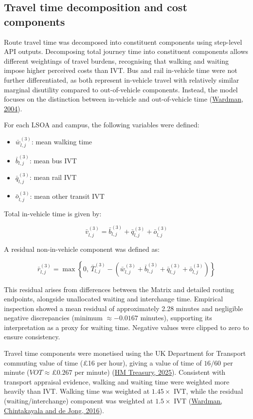 \documentclass[11pt,a4paper]{article}
\newcommand{\hcite}[2]{\hyperlink{#1}{#2}}
\newcommand{\hcite}[2]{\hyperlink{#1}{#2}}
\begin{document}
\subsection{Travel time decomposition and cost components}

Route travel time was decomposed into constituent components using step-level API outputs. Decomposing total journey time into constituent components allows different weightings of travel burdens, recognising that walking and waiting impose higher perceived costs than IVT. Bus and rail in-vehicle time were not further differentiated, as both represent in-vehicle travel with relatively similar marginal disutility compared to out-of-vehicle components. Instead, the model focuses on the distinction between in-vehicle and out-of-vehicle time (\hcite{wardman2004}{Wardman, 2004}).

For each LSOA and campus, the following variables were defined:

\begin{itemize}
    \item \(\bar{w}_{l,j}^{(3)}\): mean walking time
    \item \(\bar{b}_{l,j}^{(3)}\): mean bus IVT
    \item \(\bar{q}_{l,j}^{(3)}\): mean rail IVT
    \item \(\bar{o}_{l,j}^{(3)}\): mean other transit IVT
\end{itemize}

Total in-vehicle time is given by:

\[
\bar{v}_{l,j}^{(3)}
=
\bar{b}_{l,j}^{(3)}
+
\bar{q}_{l,j}^{(3)}
+
\bar{o}_{l,j}^{(3)}
\]

A residual non-in-vehicle component was defined as:

\[
\bar{r}_{l,j}^{(3)}
=
\max \left\{
0,\,
\bar{T}_{l,j}^{(3)}
-
\left(
\bar{w}_{l,j}^{(3)}
+
\bar{b}_{l,j}^{(3)}
+
\bar{q}_{l,j}^{(3)}
+
\bar{o}_{l,j}^{(3)}
\right)
\right\}
\]

This residual arises from differences between the Matrix and detailed routing endpoints, alongside unallocated waiting and interchange time. Empirical inspection showed a mean residual of approximately 2.28 minutes and negligible negative discrepancies (minimum \(\approx -0.0167\) minutes), supporting its interpretation as a proxy for waiting time. Negative values were clipped to zero to ensure consistency.

Travel time components were monetised using the UK Department for Transport commuting value of time (\pounds16 per hour), giving a value of time of \(16/60\) per minute (\(VOT \approx \pounds0.267\) per minute) (\hcite{hmtreasury2025}{HM Treasury, 2025}). Consistent with transport appraisal evidence, walking and waiting time were weighted more heavily than IVT. Walking time was weighted at \(1.45 \times\) IVT, while the residual (waiting/interchange) component was weighted at \(1.5 \times\) IVT (\hcite{wardman2016}{Wardman, Chintakayala and de Jong, 2016}).
\end{document}
